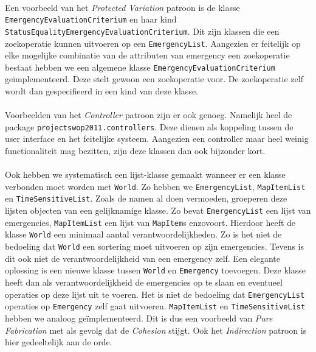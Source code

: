 \paragraph{} Een voorbeeld van het \textit{Protected Variation} patroon is de klasse \texttt{Emergency\-Evaluation\-Criterium} en haar kind \texttt{Status\-Equality\-Emergency\-Evaluation\-Criterium}. Dit zijn klassen die een zoekoperatie kunnen uitvoeren op een \texttt{EmergencyList}. Aangezien er feitelijk op elke mogelijke combinatie van de attributen van emergency een zoekoperatie bestaat hebben we een algemene klasse \texttt{Emergency\-Evaluation\-Criterium} ge\"implementeerd. Deze stelt gewoon een zoekoperatie voor. De zoekoperatie zelf wordt dan gespecifieerd in een kind van deze klasse.
\paragraph{}
Voorbeelden van het \textit{Controller} patroon zijn er ook genoeg. Namelijk heel de package \texttt{projectswop\-2011.con\-trollers}. Deze dienen als koppeling tussen de user interface en het feitelijke systeem. Aangezien een controller maar heel weinig functionaliteit mag bezitten, zijn deze klassen dan ook bijzonder kort.
\paragraph{}
Ook hebben we systematisch een lijst-klasse gemaakt wanneer er een klasse verbonden moet worden met \texttt{World}. Zo hebben we \texttt{EmergencyList}, \texttt{MapItemList} en \texttt{TimeSensitiveList}. Zoals de namen al doen vermoeden, groeperen deze lijsten objecten van een gelijknamige klasse. Zo bevat \texttt{EmergencyList} een lijst van emergencies, \texttt{MapItemList} een lijst van \texttt{MapItem}s enzovoort. Hierdoor heeft de klasse \texttt{World} een minimaal aantal verantwoordelijkheden. Zo is het niet de bedoeling dat \texttt{World} een sortering moet uitvoeren op zijn emergencies. Tevens is dit ook niet de verantwoordelijkheid van een emergency zelf. Een elegante oplossing is een nieuwe klasse tussen \texttt{World} en \texttt{Emergency} toevoegen. Deze klasse heeft dan als verantwoordelijkheid de emergencies op te slaan en eventueel operaties op deze lijst uit te voeren. Het is niet de bedoeling dat \texttt{EmergencyList} operaties op \texttt{Emergency} zelf gaat uitvoeren. \texttt{MapItemList} en \texttt{TimeSensitiveList} hebben we analoog ge\"implementeerd. Dit is dus een voorbeeld van \textit{Pure Fabrication} met als gevolg dat de \textit{Cohesion} stijgt. Ook het \textit{Indirection} patroon is hier gedeeltelijk aan de orde.
